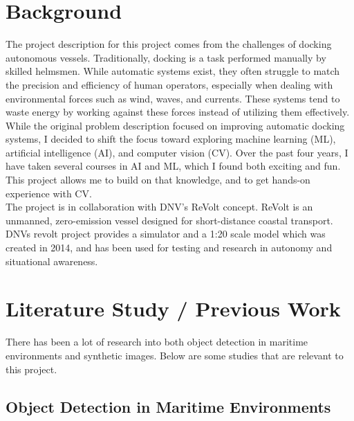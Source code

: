 




\section{Background}

The project description for this project comes from the challenges of docking autonomous vessels. Traditionally, docking is a task performed manually by skilled helmsmen. While automatic systems exist, they often struggle to match the precision and efficiency of human operators, especially when dealing with environmental forces such as wind, waves, and currents. These systems tend to waste energy by working against these forces instead of utilizing them effectively.\\

\noindent While the original problem description focused on improving automatic docking systems, I decided to shift the focus toward exploring machine learning (ML), artificial intelligence (AI), and computer vision (CV). Over the past four years, I have taken several courses in AI and ML, which I found both exciting and fun. This project allows me to build on that knowledge, and to get hands-on experience with CV.\\

\noindent The project is in collaboration with DNV's ReVolt concept. ReVolt is an unmanned, zero-emission vessel designed for short-distance coastal transport. DNVs revolt project provides a simulator and a 1:20 scale model which was created in 2014, and has been used for testing and research in autonomy and situational awareness.


\section{Literature Study / Previous Work}

There has been a lot of research into both object detection in maritime environments and synthetic images. Below are some studies that are relevant to this project.

\subsection{Object Detection in Maritime Environments}

